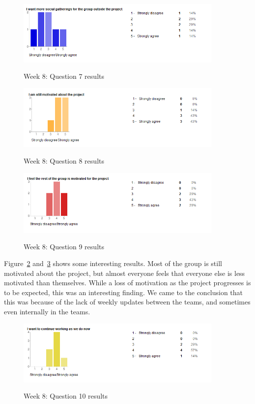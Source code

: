 \begin{figure}[th!]
\caption{Week 8: Question 7 results}
\centering
\includegraphics[width=0.9\textwidth]{evaluation/week_8_images/social}
\label{fig:W8Q7}
\end{figure}

\begin{figure}[th!]
\caption{Week 8: Question 8 results}
\centering
\includegraphics[width=0.9\textwidth]{evaluation/week_8_images/i_motivated}
\label{fig:W8Q8}
\end{figure}

\begin{figure}[th!]
\caption{Week 8: Question 9 results}
\centering
\includegraphics[width=0.9\textwidth]{evaluation/week_8_images/them_motivated}
\label{fig:W8Q9}
\end{figure}

Figure~\ref{fig:W8Q8} and~\ref{fig:W8Q9} shows some interesting results. Most of the group is still motivated about the project, but almost everyone feels that everyone else is less motivated than themselves. While a loss of motivation as the project progresses is to be expected, this was an interesting finding. We came to the conclusion that this was because of the lack of weekly updates between the teams, and sometimes even internally in the teams.

\begin{figure}[th!]
\caption{Week 8: Question 10 results}
\centering
\includegraphics[width=0.9\textwidth]{evaluation/week_8_images/continue_work}
\label{fig:W8Q10}
\end{figure}

